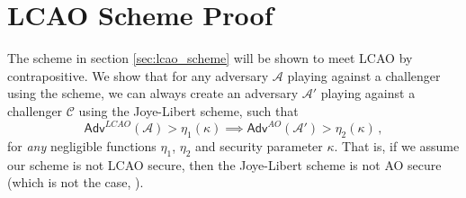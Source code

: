 \documentclass[10pt,letterpaper,oneside,twocolumn,journal]{IEEEtran}
\theoremstyle{definition}
\theoremstyle{definition}
\theoremstyle{remark}
\begin{document}
\section{LCAO Scheme Proof} \label{app:proof}
The scheme in section \ref{sec:lcao_scheme} will be shown to meet LCAO by contrapositive. We show that for any adversary $\mathcal{A}$ playing against a challenger using the scheme, we can always create an adversary $\mathcal{A}'$ playing against a challenger $\mathcal{C}$ using the Joye-Libert scheme, such that
\begin{equation*}
    \mathsf{Adv}^{LCAO}(\mathcal{A}) > \eta_1(\kappa) \implies \mathsf{Adv}^{AO}(\mathcal{A}') > \eta_2(\kappa)\,,
\end{equation*}
for \textit{any} negligible functions $\eta_1$, $\eta_2$ and security parameter $\kappa$. That is, if we assume our scheme is not LCAO secure, then the Joye-Libert scheme is not AO secure (which is not the case, \cite{joyeScalableSchemePrivacyPreserving2013}).
\end{document}
